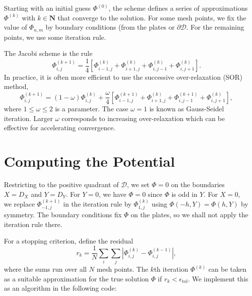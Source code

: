 \documentclass{article}
\begin{document}
Starting with an initial guess \(\Phi^{(0)}\), the scheme defines a series of approximations \(\Phi^{(k)}\) with \(k \in \mathbf{N}\) that converge to the solution. For some mesh points, we fix the value of \(\Phi_{n,m}\) by boundary conditions (from the plates or \(\partial \mathcal{D}\). For the remaining points, we use some iteration rule.

The Jacobi scheme is the rule
\[ \Phi_{i,j}^{(k+1)} = \frac{1}{4}\left[ \Phi_{i-1,j}^{(k)} + \Phi_{i+1,j}^{(k)} + \Phi_{i,j-1}^{(k)} + \Phi_{i,j+1}^{(k)} \right]. \]
In practice, it is often more efficient to use the successive over-relaxation (SOR) method,
\[ \Phi_{i,j}^{(k+1)} = (1-\omega)\Phi^{(k)}_{i,j} + \frac{\omega}{4}\left[ \Phi_{i-1,j}^{(k+1)} + \Phi_{i+1,j}^{(k)} + \Phi_{i,j-1}^{(k+1)} + \Phi_{i,j+1}^{(k)} \right], \]
where \(1 \leq \omega \leq 2\) is a parameter. The case \(\omega = 1\) is known as Gauss-Seidel iteration. Larger \(\omega\) corresponds to increasing over-relaxation which can be effective for accelerating convergence.

\section{Computing the Potential}

Restricting to the positive quadrant of \(\mathcal{D}\), we set \(\Phi = 0\) on the boundaries \(X = D_X\) and \(Y = D_Y\). For \(Y = 0\), we have \(\Phi = 0\) since \(\Phi\) is odd in \(Y\). For \(X = 0\), we replace \(\Phi^{(k+1)}_{-1,j}\) in the iteration rule by \(\Phi^{(k)}_{1,j}\) using \(\Phi(-h,Y) = \Phi(h,Y)\) by symmetry. The boundary conditions fix \(\Phi\) on the plates, so we shall not apply the iteration rule there.

For a stopping criterion, define the residual
\[ r_k = \frac{1}{N}\sum_i\sum_j\left|\Phi^{(k)}_{i,j} - \Phi^{(k-1)}_{i,j}\right|, \]
where the sums run over all \(N\) mesh points. The \(k\)th iteration \(\Phi^{(k)}\) can be taken as a suitable approximation for the true solution \(\Phi\) if \(r_k < \epsilon_{\mathrm{tol}}\). We implement this as an algorithm in the following code:
\end{document}

